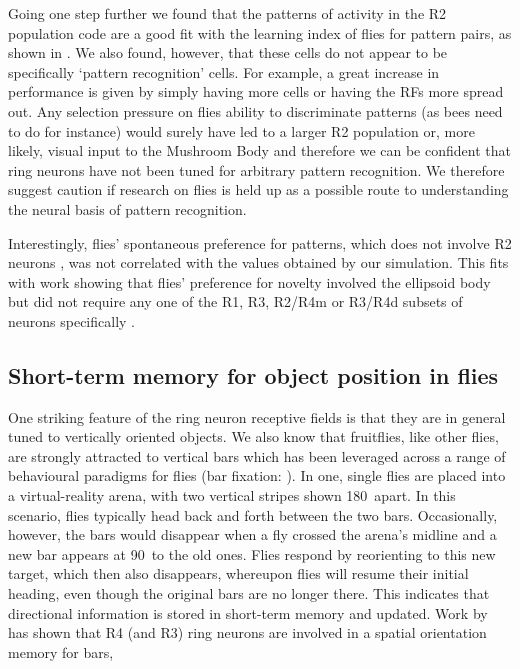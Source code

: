 \documentclass[10pt]{article}
\begin{document}
Going one step further we found that the patterns of activity in the R2 population code are a good fit with the learning index of flies for pattern pairs, as shown in \cite{Ernst1999}. We also found, however, that these cells do not appear to be specifically `pattern recognition' cells.
For example, a great increase in performance is given by simply having more cells or having the RFs more spread out. Any selection pressure on flies ability to discriminate patterns (as bees need to do for instance) would surely have led to a larger R2 population or, more likely, visual input to the Mushroom Body and therefore we can be confident that ring neurons have not been tuned for arbitrary pattern recognition. We therefore suggest caution if research on flies is held up as a possible route to understanding the neural basis of pattern recognition.

Interestingly, flies' spontaneous preference for patterns, which does not involve R2 neurons \cite{Ernst1999}, was not correlated with the values obtained by our simulation. This fits with work showing that flies' preference for novelty involved the ellipsoid body but did not require any one of the R1, R3, R2/R4m or R3/R4d subsets of neurons specifically \cite{Solanki2015}.

\subsection*{Short-term memory for object position in flies}

One striking feature of the ring neuron receptive fields is that they are in general tuned to vertically oriented objects.
We also know that fruitflies, like other flies, are strongly attracted to vertical bars which has been leveraged across a range of behavioural paradigms for flies (bar fixation: \cite{Neuser2008}). In one, single flies are placed into a virtual-reality arena, with two vertical stripes shown 180\degree\ apart.
In this scenario, flies typically head back and forth between the two bars.
Occasionally, however, the bars would disappear when a fly crossed the arena's midline and a new bar appears at 90\degree\ to the old ones.
Flies respond by reorienting to this new target, which then also disappears, whereupon flies will resume their initial heading, even though the original bars are no longer there. This indicates that directional information is stored in short-term memory and updated. Work by \cite{Neuser2008} has shown that R4 (and R3) ring neurons are involved in a spatial orientation memory for bars, 
\end{document}
